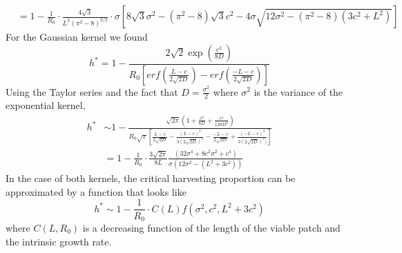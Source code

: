 \documentclass[12pt,english]{article}
\begin{document}
\begin{spacing}{1.9}
\begin{flushleft}
\begin{align*}
\\&=1-\frac{1}{R_0}\cdot\frac{4\sqrt{3}}{L^3(\pi^2-8)^{3/2}}\cdot\sigma\left[8\sqrt{3}\sigma^2-(\pi^2-8)\sqrt{3}c^2-4\sigma\sqrt{12\sigma^2-(\pi^2-8)(3c^2+L^2)}\right]
\end{align*}
For the Gaussian kernel we found 
\begin{equation}
h^*=1-\frac{2\sqrt{2}\exp\left(\frac{c^{2}}{8D}\right)}{R_0\left[erf\left(\frac{L-c}{2\sqrt{2D}}\right)-erf\left(\frac{-L-c}{2\sqrt{2D}}\right)\right]}
\end{equation} 
Using the Taylor series and the fact that $D=\frac{\sigma^2}{2}$ where $\sigma^2$ is the variance of the exponential kernel,
\begin{align*}
h^*&\sim 1-\frac{\sqrt{2\pi}(1+\frac{c^2}{8D}+\frac{c^4}{128D^2})}{R_0\sqrt{\pi}\left[\frac{L-c}{2\sqrt{2D}}-\frac{(L-c)^3}{3(2\sqrt{2D})^3}-\frac{-L-c}{2\sqrt{2D}}+\frac{(-L-c)^3}{3(2\sqrt{2D})^3)}\right]}
\\&= 1-\frac{1}{R_0}\cdot\frac{3\sqrt{2\pi}}{8L}\frac{(32\sigma^4+8c^2\sigma^2+c^4)}{\sigma\left(12\sigma^2-(L^2+3c^2)\right)}
\end{align*}
In the case of both kernels, the critical harvesting proportion can be approximated by a function that looks like 
\begin{equation}
h^*\sim1- \frac{1}{R_0}\cdot C(L)f(\sigma^2,c^2,L^2+3c^2)
\end{equation}
where $C(L,R_0)$ is a decreasing function of the length of the viable patch and the intrinsic growth rate.

\end{flushleft}
\end{spacing}
\end{document}
